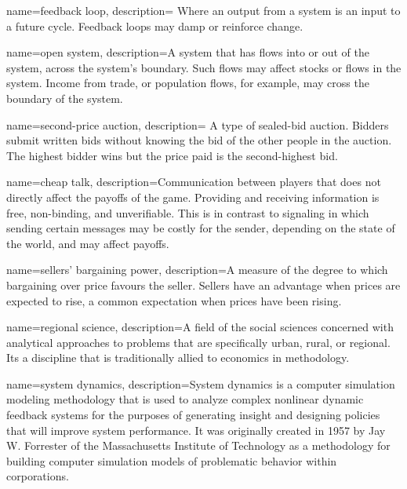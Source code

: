 {
name=feedback loop,
description={%
Where an output from a system is an input to a future cycle. Feedback loops may damp or reinforce change.}
}

{
name=open system,
description={A %
system that has flows into or out of the system, across the system's boundary. %
Such flows may affect stocks or flows in the system. Income from trade, or population flows, for example, may cross the boundary of the system.}
}

{
name=second-price auction,
description={%
A type of sealed-bid auction. Bidders submit written bids without knowing the bid of the other people in the auction. The highest bidder wins but the price paid is the second-highest bid.}
}

{
name=cheap talk,
description={Communication between players that does not directly affect the payoffs of the game. Providing and receiving information is free, non-binding, and unverifiable. This is in contrast to signaling in which sending certain messages may be costly for the sender, depending on the state of the world, and may affect payoffs.}
}

{
name=sellers' bargaining power,
description={A measure of the degree to which bargaining over price favours the seller. Sellers have an advantage when prices are expected to rise, a common expectation when prices have been rising.}
}

{
name=regional science,
description={A field of the social sciences concerned with analytical approaches to problems that are specifically urban, rural, or regional. Its a discipline that is traditionally allied to economics in methodology.}
}

{
name=system dynamics,
description={System dynamics is a computer simulation modeling methodology that is used to analyze complex nonlinear dynamic feedback systems for the purposes of generating insight and designing policies that will improve system performance. It was originally created in 1957 by Jay W. Forrester of the Massachusetts Institute of Technology as a methodology for building computer simulation models of problematic behavior within corporations.}
}

